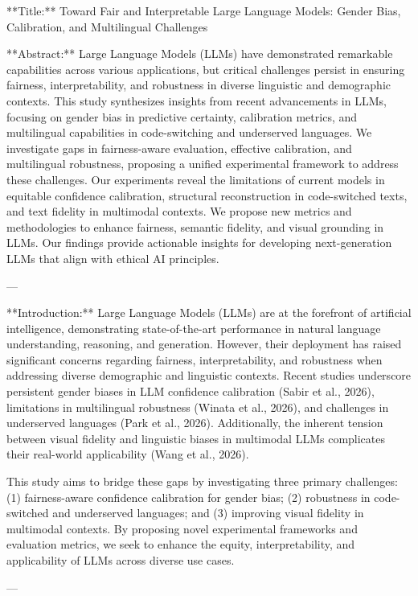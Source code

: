 **Title:**  
Toward Fair and Interpretable Large Language Models: Gender Bias, Calibration, and Multilingual Challenges  

**Abstract:**  
Large Language Models (LLMs) have demonstrated remarkable capabilities across various applications, but critical challenges persist in ensuring fairness, interpretability, and robustness in diverse linguistic and demographic contexts. This study synthesizes insights from recent advancements in LLMs, focusing on gender bias in predictive certainty, calibration metrics, and multilingual capabilities in code-switching and underserved languages. We investigate gaps in fairness-aware evaluation, effective calibration, and multilingual robustness, proposing a unified experimental framework to address these challenges. Our experiments reveal the limitations of current models in equitable confidence calibration, structural reconstruction in code-switched texts, and text fidelity in multimodal contexts. We propose new metrics and methodologies to enhance fairness, semantic fidelity, and visual grounding in LLMs. Our findings provide actionable insights for developing next-generation LLMs that align with ethical AI principles.  

---

**Introduction:**  
Large Language Models (LLMs) are at the forefront of artificial intelligence, demonstrating state-of-the-art performance in natural language understanding, reasoning, and generation. However, their deployment has raised significant concerns regarding fairness, interpretability, and robustness when addressing diverse demographic and linguistic contexts. Recent studies underscore persistent gender biases in LLM confidence calibration (Sabir et al., 2026), limitations in multilingual robustness (Winata et al., 2026), and challenges in underserved languages (Park et al., 2026). Additionally, the inherent tension between visual fidelity and linguistic biases in multimodal LLMs complicates their real-world applicability (Wang et al., 2026).  

This study aims to bridge these gaps by investigating three primary challenges: (1) fairness-aware confidence calibration for gender bias; (2) robustness in code-switched and underserved languages; and (3) improving visual fidelity in multimodal contexts. By proposing novel experimental frameworks and evaluation metrics, we seek to enhance the equity, interpretability, and applicability of LLMs across diverse use cases.  

---

